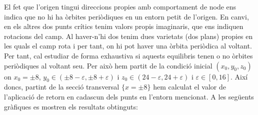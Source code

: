 \documentclass[a4paper]{article}
\theoremstyle{definition}
\begin{document}
El fet que l'origen tingui direccions propies amb comportament de node ens indica que no hi ha òrbites periòdiques en un entorn petit de l'origen. En canvi, en els altres dos punts crítics tenim valors propis imaginaris, que ens indiquen rotacions del camp. Al haver-n'hi dos tenim dues varietats (dos plans) propies en les quals el camp rota i per tant, on hi pot haver una òrbita periòdica al voltant. Per tant, cal estudiar de forma exhaustiva si aquests equilibris tenen o no òrbites periòdiques al voltant seu. Per això hem partit de la condició inicial $(x_0, y_0, z_0)$ on $x_0=\pm 8$, $y_0\in (\pm 8 - \varepsilon, \pm 8 +\varepsilon)$ i $z_0\in (24 - \varepsilon, 24 +\varepsilon)$ i $\varepsilon\in[0,16]$. Així doncs, partint de la secció transversal $\{x=\pm 8\}$ hem calculat el valor de l'aplicació de retorn en cadascun dels punts en l'entorn mencionat. A les següents gràfiques es mostren els resultats obtinguts:
\end{document}
